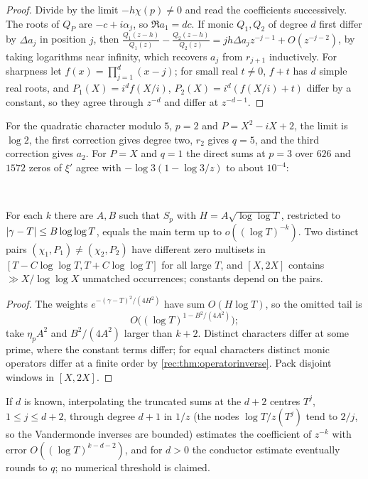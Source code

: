 \begin{proof}
Divide by the limit $-h\chi(p)\ne0$ and read the coefficients successively. The roots of $Q_P$ are
$-c+i\alpha_j$, so $\Re a_1=dc$. If monic $Q_1,Q_2$ of degree $d$ first differ by $\Delta a_j$ in position $j$, then
$\frac{Q_1(z-h)}{Q_1(z)}-\frac{Q_2(z-h)}{Q_2(z)}=jh\Delta a_jz^{-j-1}+O(z^{-j-2})$, by taking logarithms near infinity, which
recovers $a_j$ from $r_{j+1}$ inductively. For sharpness let $f(x)=\prod_{j=1}^d(x-j)$; for small real $t\ne0$,
$f+t$ has $d$ simple real roots, and $P_1(X)=i^df(X/i)$, $P_2(X)=i^d(f(X/i)+t)$ differ by a constant,
so they agree through $z^{-d}$ and differ at $z^{-d-1}$.
\end{proof}

For the quadratic character modulo $5$, $p=2$ and $P=X^2-iX+2$, the limit is $\log2$, the first
correction gives degree two, $r_2$ gives $q=5$, and the third correction gives $a_2$. For $P=X$ and
$q=1$ the direct sums at $p=3$ over $626$ and $1572$ zeros of $\xi'$ agree with $-\log3(1-\log3/z)$ to
about $10^{-4}$:
\begin{center}
\\
\end{center}

\begin{corollary}\label{rec:cor:operatorlocal}
For each $k$ there are $A,B$ such that $S_p$ with $H=A\sqrt{\log\log T}$, restricted to
$\lvert\gamma-T\rvert\le B\log\log T$, equals the main term up to $o((\log T)^{-k})$. Two distinct pairs
$(\chi_1,P_1)\ne(\chi_2,P_2)$ have different zero multisets in $[T-C\log\log T,T+C\log\log T]$ for all
large $T$, and $[X,2X]$ contains $\gg X/\log\log X$ unmatched occurrences; constants depend on the pairs.
\end{corollary}

\begin{proof}
The weights $e^{-(\gamma-T)^2/(4H^2)}$ have sum $O(H\log T)$, so the omitted tail is
\[
 O\bigl((\log T)^{1-B^2/(4A^2)}\bigr);
\]
take $\eta_pA^2$ and $B^2/(4A^2)$ larger than $k+2$. Distinct characters
differ at some prime, where the constant terms differ; for equal characters distinct monic
operators differ at a finite order by \cref{rec:thm:operatorinverse}. Pack disjoint windows in
$[X,2X]$.
\end{proof}

If $d$ is known, interpolating the truncated sums at the $d+2$ centres $T^j$, $1\le j\le d+2$, through
degree $d+1$ in $1/z$ (the nodes $\log T/z(T^j)$ tend to $2/j$, so the Vandermonde inverses are bounded)
estimates the coefficient of $z^{-k}$ with error $O((\log T)^{k-d-2})$, and for $d>0$ the conductor
estimate eventually rounds to $q$; no numerical threshold is claimed.


